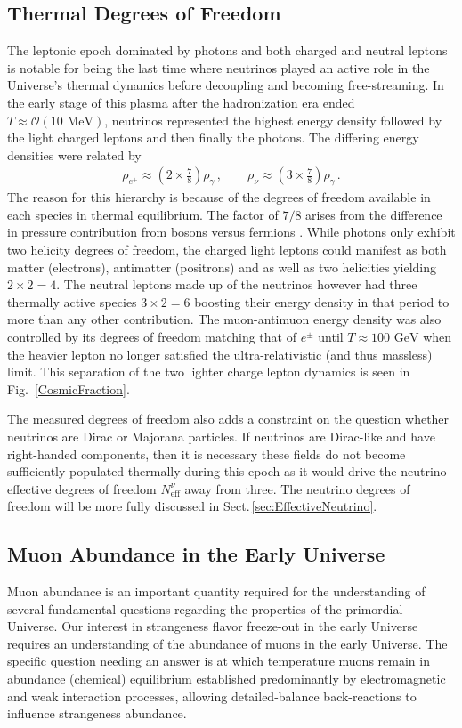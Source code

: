 \documentclass[universe,article,submit,moreauthors,pdftex,a4paper]{Definitions/mdpi}
\newcommand{\GeV}{\text{ GeV}}
\newcommand{\MeV}{\text{ MeV}}
\newcommand*{\rf}[1]{Fig.~{\ref{#1}}}
\newcommand*{\rsec}[1]{Sect.\,{\ref{#1}}}
\begin{document}
\subsection{Thermal Degrees of Freedom}\label{sec:Freedom}
\noindent The leptonic epoch dominated by photons and both charged and neutral leptons is notable for being the last time where neutrinos played an active role in the Universe's thermal dynamics before decoupling and becoming free-streaming. In the early stage of this plasma after the hadronization era ended $T\approx\mathcal{O}(10\MeV)$, neutrinos represented the highest energy density followed by the light charged leptons and then finally the photons. The differing energy densities were related by
\begin{align}
\rho_{e^{\pm}}\approx\left(2\times\frac{7}{8}\right)\rho_{\gamma}\,,\qquad\rho_{\nu}\approx\left(3\times\frac{7}{8}\right)\rho_{\gamma}\,.
\end{align}
The reason for this hierarchy is because of the degrees of freedom \cite{Rafelski:2013yka} available in each species in thermal equilibrium. The factor of $7/8$ arises from the difference in pressure contribution from bosons versus fermions \cite{Rafelski:2013yka}. While photons only exhibit two helicity degrees of freedom, the charged light leptons could manifest as both matter (electrons), antimatter (positrons) and as well as two helicities yielding $2\times2=4$. The neutral leptons made up of the neutrinos however had three thermally active species $3\times2=6$ boosting their energy density in that period to more than any other contribution. The muon-antimuon energy density was also controlled by its degrees of freedom matching that of $e^{\pm}$ until $T\approx100\GeV$ when the heavier lepton no longer satisfied the ultra-relativistic (and thus massless) limit. This separation of the two lighter charge lepton dynamics is seen in \rf{CosmicFraction}.

The measured degrees of freedom also adds a constraint on the question whether neutrinos are Dirac or Majorana particles. If neutrinos are Dirac-like and have right-handed components, then it is necessary these fields do not become sufficiently populated thermally during this epoch as it would drive the neutrino effective degrees of freedom $N^{\nu}_{\mathrm{eff}}$ away from three. The neutrino degrees of freedom will be more fully discussed in \rsec{sec:EffectiveNeutrino}.

\subsection{Muon Abundance in the Early Universe} \label{sec:Muons}
\noindent Muon abundance is an important quantity required for the understanding of several fundamental questions regarding the properties of the primordial Universe. Our interest in strangeness flavor freeze-out in the early Universe \cite{Yang:2021bko} requires an understanding of the abundance of muons in the early Universe. The specific question needing an answer is at which temperature muons remain in abundance (chemical) equilibrium established predominantly by electromagnetic and weak interaction processes, allowing detailed-balance back-reactions to influence strangeness abundance.
\end{document}
